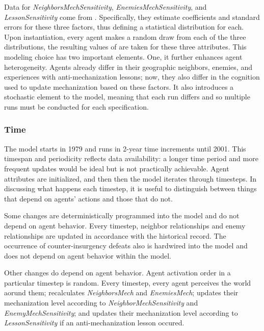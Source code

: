 \documentclass{article}
\begin{document}
Data for \textit{NeighborsMechSensitivity}, \textit{EnemiesMechSensitivity}, and
\textit{LessonSensitivity} come from \citet{sechser2010army}. Specifically, they
estimate coefficients and standard errors for these three factors, thus defining
a statistical distribution for each. Upon instantiation, every agent makes a
random draw from each of the three distributions, the resulting values of are
taken for these three attributes. This modeling choice has two important
elements. One, it further enhances agent heterogeneity. Agents already differ in
their geographic neighbors, enemies, and experiences with anti-mechanization
lessons; now, they also differ in the cognition used to update mechanization
based on these factors. It also introduces a stochastic element to the
model, meaning that each run differs and so multiple runs must be conducted for
each specification.

\subsubsection{Time}

The model starts in 1979 and runs in 2-year time increments until 2001. This
timespan and periodicity reflects data availability: a longer time period and
more frequent updates would be ideal but is not practically achievable. Agent
attributes are initialized, and then then the model iterates through timesteps. 
In discussing what happens each timestep, it is useful to distinguish between
things that depend on agents' actions and those that do not.

Some changes are deterministically programmed into the model and do not depend on
agent behavior. Every timestep, neighbor relationships and enemy relationships
are updated in accordance with the historical record. The occurrence of
counter-insurgency defeats also is hardwired into the model and does not depend
on agent behavior within the model.

Other changes do depend on agent behavior. Agent activation order in a
particular timestep is random. Every timestep, every agent perceives the world
aorund them; recalculates \textit{NeighborsMech} and \textit{EnemiesMech};
updates their mechanization level according to \textit{NeighborMechSensitivity}
and \textit{EnemyMechSensitivity}; and updates their mechanization level
according to \textit{LessonSensitivity} if an anti-mechanization lesson occured.
\end{document}

